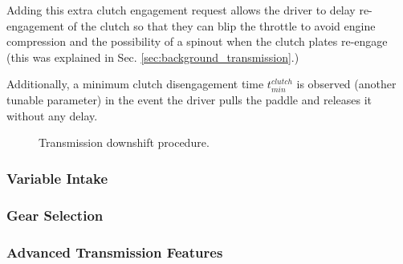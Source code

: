 Adding this extra clutch engagement request allows the driver to delay re-engagement of the clutch so that they can blip the throttle to avoid engine compression and the possibility of a spinout when the clutch plates re-engage (this was explained in Sec. \ref{sec:background_transmission}.)

Additionally, a minimum clutch disengagement time $t^{clutch}_{min}$ is observed (another tunable parameter) in the event the driver pulls the paddle and releases it without any delay.


\begin{figure}[H]
\centering

\caption{Transmission downshift procedure.}
\label{fig:transmission_downshift_flow}
\end{figure}

\subsubsection{Variable Intake}

\subsubsection{Gear Selection \label{sec:design_engine_transmission_gear_selection}}

\subsubsection{Advanced Transmission Features}

